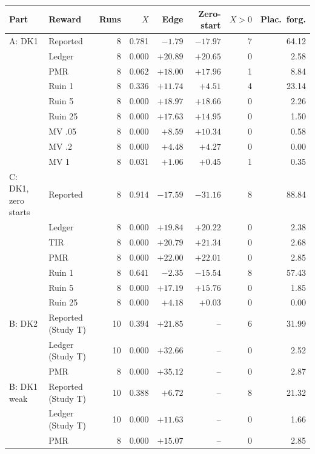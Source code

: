 \begin{tabularx}{\linewidth}{@{}llrrrrrr@{}}
\toprule
Part & Reward & Runs & $X$ & Edge & Zero-start & $X>0$ & Plac.\ forg. \\
\midrule
A: DK1 & Reported & 8 & 0.781 & $-1.79$ & $-17.97$ & 7 & 64.12 \\
 & Ledger & 8 & 0.000 & $+20.89$ & $+20.65$ & 0 & 2.58 \\
 & PMR & 8 & 0.062 & $+18.00$ & $+17.96$ & 1 & 8.84 \\
 & Ruin 1 & 8 & 0.336 & $+11.74$ & $+4.51$ & 4 & 23.14 \\
 & Ruin 5 & 8 & 0.000 & $+18.97$ & $+18.66$ & 0 & 2.26 \\
 & Ruin 25 & 8 & 0.000 & $+17.63$ & $+14.95$ & 0 & 1.50 \\
 & MV .05 & 8 & 0.000 & $+8.59$ & $+10.34$ & 0 & 0.58 \\
 & MV .2 & 8 & 0.000 & $+4.48$ & $+4.27$ & 0 & 0.00 \\
 & MV 1 & 8 & 0.031 & $+1.06$ & $+0.45$ & 1 & 0.35 \\
\midrule
C: DK1, zero starts & Reported & 8 & 0.914 & $-17.59$ & $-31.16$ & 8 & 88.84 \\
 & Ledger & 8 & 0.000 & $+19.84$ & $+20.22$ & 0 & 2.38 \\
 & TIR & 8 & 0.000 & $+20.79$ & $+21.34$ & 0 & 2.68 \\
 & PMR & 8 & 0.000 & $+22.00$ & $+22.01$ & 0 & 2.85 \\
 & Ruin 1 & 8 & 0.641 & $-2.35$ & $-15.54$ & 8 & 57.43 \\
 & Ruin 5 & 8 & 0.000 & $+17.19$ & $+15.76$ & 0 & 1.85 \\
 & Ruin 25 & 8 & 0.000 & $+4.18$ & $+0.03$ & 0 & 0.00 \\
\midrule
B: DK2 & Reported (Study T) & 10 & 0.394 & $+21.85$ & -- & 6 & 31.99 \\
 & Ledger (Study T) & 10 & 0.000 & $+32.66$ & -- & 0 & 2.52 \\
 & PMR & 8 & 0.000 & $+35.12$ & -- & 0 & 2.87 \\
\midrule
B: DK1 weak & Reported (Study T) & 10 & 0.388 & $+6.72$ & -- & 8 & 21.32 \\
 & Ledger (Study T) & 10 & 0.000 & $+11.63$ & -- & 0 & 1.66 \\
 & PMR & 8 & 0.000 & $+15.07$ & -- & 0 & 2.85 \\
\bottomrule
\end{tabularx}

